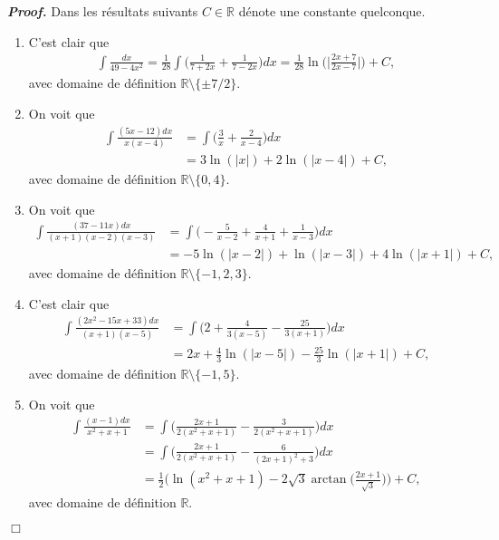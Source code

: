 \documentclass[11pt,a4paper]{article}
\newcommand{\RR}{\mathbb{R}}
\newcommand{\R}{\RR}
\newenvironment{preuve}[1][]
{\vskip 2mm  \noindent\emph{\bf Proof#1. }}{$\Box$ \vskip 2mm}
\begin{document}
\begin{preuve}
Dans les résultats suivants $C \in \R$ dénote une constante quelconque. 
\begin{enumerate}
\item C'est clair que
\begin{align*}
     \int\frac{dx}{49-4x^2} =  \frac{1}{28} \int \bigg( \frac{1}{7+2x} + \frac{1}{7-2x} \bigg) dx = \frac{1}{28} \ln\bigg(\bigg| \frac{2x+7}{2x-7} \bigg|\bigg) + C,     
     \end{align*}
avec domaine de définition $\R \setminus \{ \pm 7/2 \}$. 

\item On voit que 
\begin{align*}     \int\frac{(5x-12)dx}{x(x-4)} &= \int \bigg( \frac{3}{x} + \frac{2}{x-4}   \bigg) dx 
\\ 
&= 3 \ln(|x|) + 2\ln(|x-4|)  + C,     
\end{align*}
avec domaine de définition $\R \setminus \{ 0, 4 \}$. 


\item On voit que 
\begin{align*}     \int\frac{(37-11x)dx}{(x+1)(x-2)(x-3)} &= \int \bigg( -\frac{5}{x-2} + \frac{4}{x+1} + \frac{1}{x-3}  \bigg) dx 
\\ 
&= -5 \ln(|x-2|) + \ln(|x-3|) + 4  \ln(|x+1|) + C,     
\end{align*}
avec domaine de définition $\R \setminus \{ -1, 2, 3 \}$. 

\item C'est clair que 
\begin{align*}
    \int\frac{(2x^2-15x+33)dx}{(x+1)(x-5)} &= \int \bigg( 2+ \frac{4}{3(x-5)} - \frac{25}{3(x+1)}  \bigg) dx 
\\    
   &= 
2x + \frac{4}{3} \ln(|x-5|) - \frac{25}{3} \ln(|x+1|) + C,     
\end{align*}
avec domaine de définition $\R \setminus \{ -1, 5 \}$. 

\item On voit que 
\begin{align*}     
\int\frac{(x-1)dx}{x^2+x+1} &= \int \bigg( \frac{2x+1}{2(x^2+x+1)} - \frac{3}{2(x^2+x+1)}  \bigg) dx 
\\
&= \int \bigg( \frac{2x+1}{2(x^2+x+1)} - \frac{6}{(2 x+1)^{2}+3}  \bigg) dx 
\\
&= \frac{1}{2} \bigg(\ln(x^2+x+1) - 2 \sqrt{3} \arctan\bigg(\frac{2x+1}{\sqrt{3}}\bigg) \bigg) + C,     
\end{align*}
avec domaine de définition $\R$. 


\end{enumerate}
\end{preuve}
\end{document}
